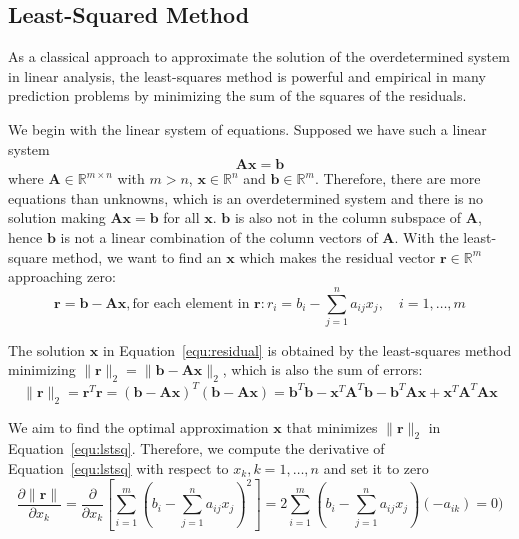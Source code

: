 \subsection{Least-Squared Method}
As a classical approach to approximate the solution of the overdetermined system in linear analysis, the least-squares method is powerful and empirical in many prediction problems by minimizing the sum of the squares of the residuals.~\citep{DB:10} 
\par We begin with the linear system of equations. Supposed we have such a linear system
\begin{equation}
    \mathbf{A}\mathbf{x} = \mathbf{b}
\end{equation}
where $\mathbf{A} \in \mathbb{R}^{m \times n}$ with $m > n$, $\mathbf{x} \in \mathbb{R}^n$ and $\mathbf{b} \in \mathbb{R}^{m}$. Therefore, there are more equations than unknowns, which is an overdetermined system and there is no solution making $\mathbf{A}\mathbf{x} = \mathbf{b}$ for all $\mathbf{x}$. $\mathbf{b}$ is also not in the column subspace of $\mathbf{A}$, hence $\mathbf{b}$ is not a linear combination of the column vectors of $\mathbf{A}$. With the least-square method, we want to find an $\mathbf{x}$ which makes the residual vector $\mathbf{r} \in \mathbb{R}^m$ approaching zero:
\begin{equation}
    \label{equ:residual}
    \mathbf{r} = \mathbf{b} - \mathbf{A}\mathbf{x}, \text{for each element in } \mathbf{r}:  r_i = b_i - \sum_{j=1}^{n} a_{i j} x_{j}, \quad i = 1, \dots, m
\end{equation}
\par The solution $\mathbf{x}$ in Equation~\ref{equ:residual} is obtained by the least-squares method minimizing $\|\mathbf{r}\|_2 = \|\mathbf{b} - \mathbf{A}\mathbf{x}\|_2$, which is also the sum of errors:
\begin{equation}
    \label{equ:lstsq}
    \|\mathbf{r}\|_2 = \mathbf{r}^{T} \mathbf{r}=(\mathbf{b}-\mathbf{A} \mathbf{x})^{T}(\mathbf{b}-\mathbf{A} \mathbf{x})=\mathbf{b}^{T} \mathbf{b}-\mathbf{x}^{T} \mathbf{A}^{T} \mathbf{b}-\mathbf{b}^{T} \mathbf{A} \mathbf{x}+\mathbf{x}^{T} \mathbf{A}^{T} \mathbf{A} \mathbf{x}
\end{equation}
\par We aim to find the optimal approximation $\mathbf{x}$ that minimizes $\|\mathbf{r}\|_2$ in Equation~\ref{equ:lstsq}. Therefore, we compute the derivative of Equation~\ref{equ:lstsq} with respect to $x_k, k = 1, \dots, n$ and set it to zero
\begin{equation}
    \label{equ:lstsq-gradient}
    \frac{\partial \|\mathbf{r}\|}{\partial x_{k}}=\frac{\partial}{\partial x_{k}}\left[\sum_{i=1}^{m}\left(b_{i}-\sum_{j=1}^{n} a_{i j} x_{j}\right)^{2}\right]=2 \sum_{i=1}^{m}\left(b_{i}-\sum_{j=1}^{n} a_{i j} x_{j}\right)\left(-a_{i k}\right)=0)
\end{equation}
